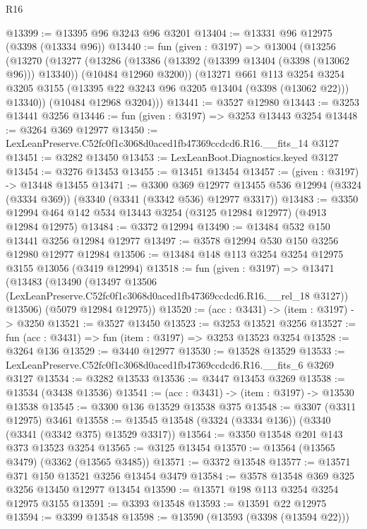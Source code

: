 \begin{lexlean}{R16}
\begin{coremodule}
@13399 := @13395 @96 @3243 @96 @3201
@13404 := @13331 @96 @12975 (@3398 (@13334 @96))
@13440 := fun (given : @3197) =>
  @13004
    (@13256
      (@13270
        (@13277
          (@13286
            (@13386 (@13392 (@13399 @13404 (@3398 (@13062 @96))) @13340))
            (@10484 @12960 @3200))
          (@13271
            @661
            @113
            @3254
            @3254
            @3205
            @3155
            (@13395 @22 @3243 @96 @3205 @13404 (@3398 (@13062 @22)))
            @13340))
        (@10484 @12968 @3204)))
@13441 := @3527 @12980
@13443 := @3253 @13441 @3256
@13446 := fun (given : @3197) => @3253 @13443 @3254
@13448 := @3264 @369 @12977
@13450 := LexLeanPreserve.C52fc0f1c3068d0aced1fb47369ccdcd6.R16.__fits_14 @3127
@13451 := @3282 @13450
@13453 := LexLeanBoot.Diagnostics.keyed @3127
@13454 := @3276 @13453
@13455 := @13451 @13454
@13457 := (given : @3197) -> @13448 @13455
@13471 := @3300
    @369
    @12977
    @13455
    @536
    @12994
    (@3324 (@3334 @369))
    (@3340 (@3341 (@3342 @536) @12977 @3317))
@13483 := @3350 @12994 @464 @142 @534 @13443 @3254 (@3125 @12984 @12977) (@4913 @12984 @12975)
@13484 := @3372 @12994
@13490 := @13484 @532 @150 @13441 @3256 @12984 @12977
@13497 := @3578 @12994 @530 @150 @3256 @12980 @12977 @12984
@13506 := @13484 @148 @113 @3254 @3254 @12975 @3155 @13056 (@3419 @12994)
@13518 := fun (given : @3197) =>
  @13471
    (@13483
      (@13490
        (@13497 @13506 (LexLeanPreserve.C52fc0f1c3068d0aced1fb47369ccdcd6.R16.__rel_18 @3127))
        @13506)
      (@5079 @12984 @12975))
@13520 := (acc : @3431) -> (item : @3197) -> @3250
@13521 := @3527 @13450
@13523 := @3253 @13521 @3256
@13527 := fun (acc : @3431) => fun (item : @3197) => @3253 @13523 @3254
@13528 := @3264 @136
@13529 := @3440 @12977
@13530 := @13528 @13529
@13533 := LexLeanPreserve.C52fc0f1c3068d0aced1fb47369ccdcd6.R16.__fits_6 @3269 @3127
@13534 := @3282 @13533
@13536 := @3447 @13453 @3269
@13538 := @13534 (@3438 @13536)
@13541 := (acc : @3431) -> (item : @3197) -> @13530 @13538
@13545 := @3300 @136 @13529 @13538 @375
@13548 := @3307 (@3311 @12975) @3461
@13558 := @13545 @13548 (@3324 (@3334 @136)) (@3340 (@3341 (@3342 @375) @13529 @3317))
@13564 := @3350 @13548 @201 @143 @373 @13523 @3254
@13565 := @3125 @13454
@13570 := @13564 (@13565 @3479) (@3362 (@13565 @3485))
@13571 := @3372 @13548
@13577 := @13571 @371 @150 @13521 @3256 @13454 @3479
@13584 := @3578 @13548 @369 @325 @3256 @13450 @12977 @13454
@13590 := @13571 @198 @113 @3254 @3254 @12975 @3155
@13591 := @3393 @13548
@13593 := @13591 @22 @12975
@13594 := @3399 @13548
@13598 := @13590 (@13593 (@3398 (@13594 @22)))

\end{coremodule}
\end{lexlean}
